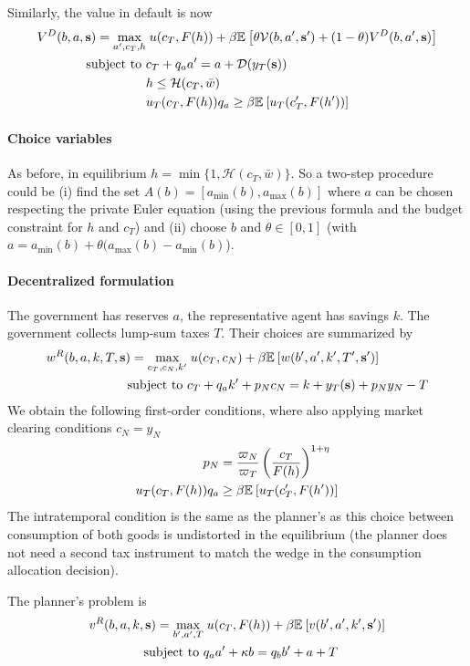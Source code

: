 Similarly, the value in default is now
\begin{align}
	V^D(b,a,\text{\textbf{s}}) = \max_{a',c_T, h} &\; u(c_T, F(h)) + \beta \mathbb{E}_{{}}\left[  \theta \mathcal{V}(b,a',\text{\textbf{s}}') + (1-\theta) V^D(b,a',\text{\textbf{s}})  \right] \\
	\text{subject to }
	& c_T + q_a a' = a + \mathcal{D}(y_T(\text{\textbf{s}})) \notag \\
	& h \leq \mathcal{H}(c_T, \bar{w}) \notag \\
	& u_T(c_T, F(h)) q_a \geq \beta \mathbb{E}_{{}}\left[ u_T(c_T', F(h')) \right] \notag
\end{align}

\paragraph{Choice variables} As before, in equilibrium $h = \min\{1,\mathcal{H}(c_T, \bar{w})\}$. So a two-step procedure could be (i) find the set $A(b) = [a_{\min}(b), a_{\max}(b)]$ where $a$ can be chosen respecting the private Euler equation (using the previous formula and the budget constraint for $h$ and $c_T$) and (ii) choose $b$ and $\theta \in [0,1]$ (with $a = a_{\min}(b) + \theta (a_{\max}(b) - a_{\min}(b)$).

\paragraph{Decentralized formulation}
The government has reserves $a$, the representative agent has savings $k$. The government collects lump-sum taxes $T$. Their choices are summarized by
\begin{align}
	w^R(b,a,k,T,\text{\textbf{s}}) = \max_{c_T, c_N, k'} &\; u(c_T, c_N) + \beta \mathbb{E}_{{}}\left[ w(b',a',k',T',\text{\textbf{s}}') \right] \\
	\text{subject to } 
	& c_T + q_a k' + p_N c_N = k + y_T(\text{\textbf{s}}) + p_N y_N - T \notag
\end{align}
We obtain the following first-order conditions, where also applying market clearing conditions $c_N = y_N$
\begin{align*}
	p_N &= \frac{\varpi_N}{\varpi_T} \left( \frac{c_T}{F(h)} \right)^{1+\eta} \\
	u_T(c_T, F(h)) q_a &\geq \beta \mathbb{E}_{{}}\left[ u_T(c_T', F(h')) \right]
\end{align*}
The intratemporal condition is the same as the planner's as this choice between consumption of both goods is undistorted in the equilibrium (the planner does not need a second tax instrument to match the wedge in the consumption allocation decision).

The planner's problem is
\begin{align}
	v^R(b,a,k,\text{\textbf{s}}) = \max_{b',a',T} &\; u(c_T, F(h)) + \beta \mathbb{E}_{{}}\left[ v(b',a',k',\text{\textbf{s}}') \right] \\
	\text{subject to }
	& q_a a' + \kappa b = q_b b' + a + T \notag
\end{align}
